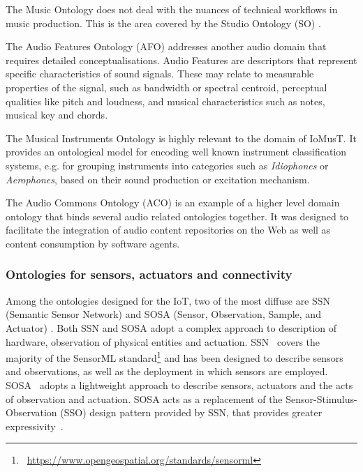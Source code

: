 The Music Ontology does not deal with the nuances of technical workflows in music production. This is the area covered by the Studio Ontology  (SO) \cite{fazekas2011studio}. 

The Audio Features Ontology  (AFO) addresses another audio domain that requires detailed conceptualisations. Audio Features are descriptors that represent specific characteristics of sound signals. These may relate to measurable properties of the signal, such as bandwidth or spectral centroid, perceptual qualities like pitch and loudness, and musical characteristics such as notes, musical key and chords.

The Musical Instruments Ontology \cite{kolozali2011knowledge} is highly relevant to the domain of IoMusT. It provides an ontological model for encoding well known instrument classification systems, e.g. for grouping instruments into categories such as \textit{Idiophones} or \textit{Aerophones}, based on their sound production or excitation mechanism.

The Audio Commons Ontology (ACO)  \cite{ceriani2018audio} is an example of a higher level domain ontology that binds several audio related ontologies together. It was designed to facilitate the integration of audio content repositories on the Web as well as content consumption by software agents. 

\subsubsection{\textsf{Ontologies for sensors, actuators and connectivity}}
Among the ontologies designed for the IoT, two of the most diffuse are SSN (Semantic Sensor Network) and SOSA (Sensor, Observation, Sample, and Actuator) . Both SSN and SOSA adopt a complex approach to description of hardware, observation of physical entities and actuation. SSN~\cite{compton2011ssn} covers the majority of the SensorML standard\footnote{\faLink~\url{https://www.opengeospatial.org/standards/sensorml}} and has been designed to describe sensors and observations, as well as the deployment in which sensors are employed. SOSA~\cite{janowicz2018sosa} adopts a lightweight approach to describe sensors, actuators and the acts of observation and actuation. SOSA acts as a replacement of the Sensor-Stimulus-Observation (SSO) design pattern provided by SSN, that provides greater expressivity~\cite{haller2018sosa}.

